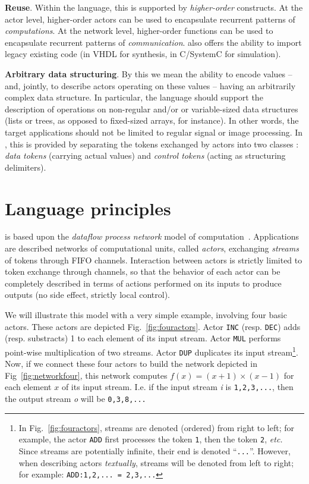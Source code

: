 \medskip
\textbf{Reuse}. Within the language, this is supported by \emph{higher-order} constructs. At the
actor level, higher-order actors can be used to encapsulate recurrent patterns of
\emph{computations}. At the network level, higher-order functions can be used to encapsulate recurrent patterns of
\emph{communication}. \caph also offers the ability to import legacy existing code (in VHDL for
synthesis, in C/SystemC for simulation).

\medskip
\textbf{Arbitrary data structuring}. By this we mean the ability to encode values -- and, jointly,
to describe actors operating on these values -- having an arbitrarily complex data structure.
In particular, the language should support the description of operations on 
non-regular and/or or variable-sized data structures (lists or trees, as opposed to fixed-sized
arrays, for instance). In other words, the target applications should not be limited to regular
signal or image processing. In \caph, this is provided by separating the tokens exchanged by actors
into two classes : \emph{data tokens} (carrying actual values) and \emph{control tokens} (acting as
structuring delimiters). 

\section{Language principles}
\label{sec:language-principles}

\caph is based upon the \emph{dataflow process network} model of computation~\cite{DPN}.
Applications are described networks of computational units, called \emph{actors}, exchanging
\emph{streams} of tokens through FIFO channels.
Interaction between actors is strictly limited to token exchange
through channels, so that the behavior of each actor can be completely described in terms of actions
performed on its inputs to produce outputs (no side effect, strictly local control).

We will illustrate this model with a very simple example, involving four basic actors. These actors
are depicted Fig.~\ref{fig:fouractors}. Actor \texttt{INC} (resp. \texttt{DEC}) adds
(resp. substracts) 1 to each element of its input stream. Actor \texttt{MUL} performs point-wise
multiplication of two streams. Actor \texttt{DUP} duplicates its input stream\footnote{In
  Fig.~\ref{fig:fouractors}, streams are denoted (ordered) from right to left; for example, the
  actor \texttt{ADD} first processes the token \texttt{1}, then the token \texttt{2}, \emph{etc.}
  Since streams are potentially infinite, their end is denoted ``\texttt{...}''. However, when describing
  actors \emph{textually}, streams will be denoted from left to right; for example:
  \texttt{ADD:1,2,... = 2,3,...}}. Now, if we connect
these four actors to build the network depicted in Fig~\ref{fig:networkfour}, this network computes
$f(x)=(x+1)\times(x-1)$ for each element $x$ of its input stream. I.e. if the input stream \emph{i}
is \texttt{1,2,3,...}, then the output stream \emph{o} will be \texttt{0,3,8,...}

